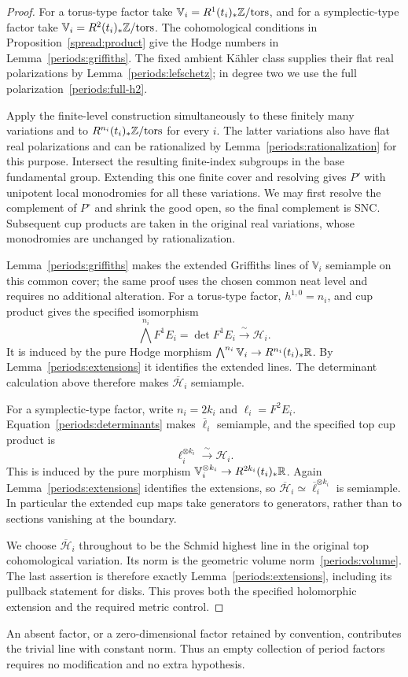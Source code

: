 \begin{proof}
For a torus-type factor take
$\mathbb V_i=R^1(t_i)_*\mathbb Z/\mathrm{tors}$, and for a symplectic-type
factor take $\mathbb V_i=R^2(t_i)_*\mathbb Z/\mathrm{tors}$.
The cohomological conditions in Proposition~\ref{spread:product} give
the Hodge numbers in Lemma~\ref{periods:griffiths}.  The fixed ambient
K\"ahler class supplies their flat real polarizations by
Lemma~\ref{periods:lefschetz}; in degree two we use the full
polarization~\eqref{periods:full-h2}.

Apply the finite-level construction simultaneously to these finitely many
variations and to $R^{n_i}(t_i)_*\mathbb Z/\mathrm{tors}$ for every $i$.
The latter variations also have flat real polarizations and can be
rationalized by Lemma~\ref{periods:rationalization} for this purpose.
Intersect the resulting finite-index subgroups in the base fundamental
group.  Extending this one finite cover and resolving gives $P'$ with
unipotent local monodromies for all these variations.  We may first
resolve the complement of $P^\circ$ and shrink the good open, so the
final complement is SNC.  Subsequent cup products are taken in the
original real variations, whose monodromies are unchanged by
rationalization.

Lemma~\ref{periods:griffiths} makes the extended Griffiths lines of
$\mathbb V_i$ semiample on this common cover; the same proof uses the
chosen common neat level and requires no additional alteration.
For a torus-type factor, $h^{1,0}=n_i$, and cup product gives the
specified isomorphism
\[
 \bigwedge^{n_i}F^1E_i=\det F^1E_i
       \xrightarrow{\ \sim\ }\mathcal H_i.
\]
It is induced by the pure Hodge morphism
$\bigwedge^{n_i}\mathbb V_i\to R^{n_i}(t_i)_*\mathbb R$.
By Lemma~\ref{periods:extensions} it identifies the extended lines.
The determinant calculation above therefore makes
$\overline{\mathcal H}_i$ semiample.

For a symplectic-type factor, write $n_i=2k_i$ and $\ell_i=F^2E_i$.
Equation~\eqref{periods:determinants} makes $\overline\ell_i$ semiample,
and the specified top cup product is
\[
 \ell_i^{\otimes k_i}\xrightarrow{\ \sim\ }\mathcal H_i.
\]
This is induced by the pure morphism
$\mathbb V_i^{\otimes k_i}\to R^{2k_i}(t_i)_*\mathbb R$.
Again Lemma~\ref{periods:extensions} identifies the extensions, so
$\overline{\mathcal H}_i\simeq\overline\ell_i^{\otimes k_i}$ is
semiample.  In particular the extended cup maps take generators to
generators, rather than to sections vanishing at the boundary.

We choose $\overline{\mathcal H}_i$ throughout to be the Schmid highest
line in the original top cohomological variation.  Its norm is the
geometric volume norm~\eqref{periods:volume}.  The last assertion is
therefore exactly Lemma~\ref{periods:extensions}, including its pullback
statement for disks.  This proves both the specified holomorphic
extension and the required metric control.
\end{proof}

An absent factor, or a zero-dimensional factor retained by convention,
contributes the trivial line with constant norm.  Thus an empty collection
of period factors requires no modification and no extra hypothesis.
